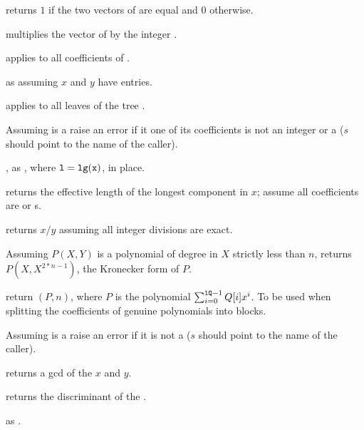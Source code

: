 
 returns $1$ if the two vectors of 
are equal and $0$ otherwise.

 multiplies the vector of  
by the integer .

 applies  to all
coefficients of .

 as  assuming $x$
and $y$ have  entries.


 applies  to all
leaves of the tree .


 Assuming  is a 
raise an error if it one of its coefficients is not an integer or a 
($s$ should point to the name of the caller).

, as , where
${\tt l} = {\tt lg(x)}$, in place.

 returns the effective length of the longest
component in $x$; assume all coefficients are  or s.

 returns $x/y$ assuming all integer
divisions are exact.

 Assuming $P(X,Y)$ is a polynomial
of degree in $X$ strictly less than $n$, returns $P(X,X^{2*n-1})$, the
Kronecker form of $P$.

 return
$(P, n)$, where $P$ is the polynomial
$\sum_{i = 0}^{{\tt lQ} - 1} Q[i] x^i$. To be used when splitting
the coefficients of genuine polynomials into blocks.


 Assuming  is a 
raise an error if it is not a  ($s$ should point to the name of the
caller).

 returns a gcd of the  $x$ and $y$.

 returns the discriminant of the 
.

 as .

